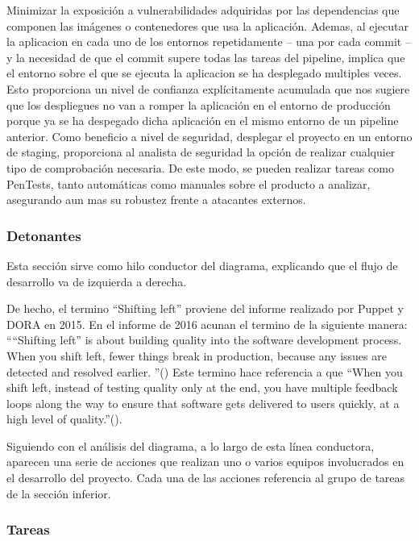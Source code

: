 \documentclass[12pt]{report} %
\begin{document}
Minimizar la exposición a vulnerabilidades adquiridas por las dependencias que
componen las imágenes o contenedores que usa la aplicación.
Ademas, al ejecutar la aplicacion en cada uno de los entornos repetidamente --
una por cada \gls{commit} -- y la necesidad de que el \gls{commit} supere todas
las tareas del \gls{pipeline}, implica que el entorno sobre el que se ejecuta la
aplicacion se ha desplegado multiples veces.  Esto proporciona un nivel de
confianza explícitamente acumulada que nos sugiere que los despliegues no van a
romper la aplicación en el entorno de producción porque ya se ha despegado dicha
aplicación en el mismo entorno de un \gls{pipeline} anterior.  Como beneficio a
nivel de seguridad, desplegar el proyecto en un entorno de staging, proporciona
al analista de seguridad la opción de realizar cualquier tipo de comprobación
necesaria.  De este modo, se pueden realizar tareas como \gls{PenTest}s, tanto
automáticas como manuales sobre el producto a analizar, asegurando aun mas su
robustez frente a atacantes externos.

\subsubsection{Detonantes}
 
Esta sección sirve como hilo conductor del diagrama, explicando que el flujo de
desarrollo va de izquierda a derecha.

De hecho, el termino ``Shifting left'' proviene del informe realizado por Puppet
y DORA en 2015. En el informe de 2016 acunan el termino de la siguiente manera:
``“Shifting left” is about building quality  into the software development
process. When you shift left, fewer things break in production, because any
issues are detected and resolved earlier. ''(\cite{SODO2016})
Este termino hace referencia a que ``When you shift left, instead of testing
quality only at the end, you have multiple feedback loops along the way to
ensure that software gets delivered to users quickly, at a high level of
quality.''(\cite{SODO2016}).

Siguiendo con el análisis del diagrama, a lo largo de esta línea conductora,
aparecen una serie de acciones que realizan uno o varios equipos involucrados en
el desarrollo del proyecto.
Cada una de las acciones referencia al grupo de tareas de la sección inferior.

\subsubsection{Tareas}
\end{document}

